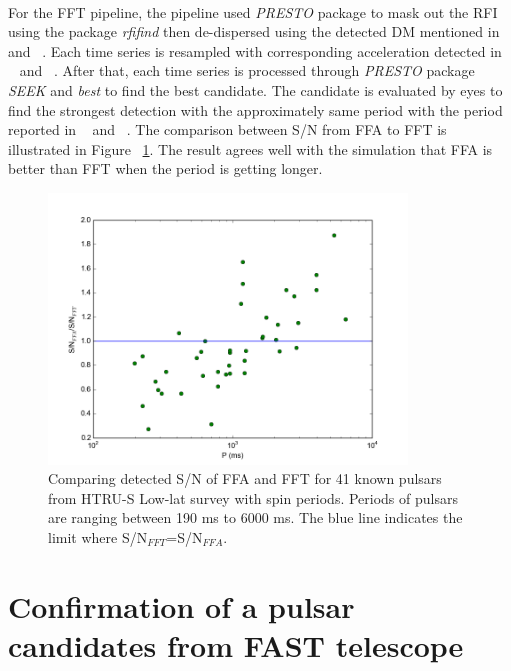 \documentclass[thesis_msc.tex]{subfiles}
\begin{document}
    \paragraph{} For the FFT pipeline, the pipeline used \textit{PRESTO} package to mask out the RFI using the package \textit{rfifind} then de-dispersed using the detected DM mentioned in ~\cite{Andrew} and ~\cite{Ng}. Each time series is resampled with corresponding acceleration detected in ~\cite{Andrew} and ~\cite{Ng}. After that, each time series is processed through \textit{PRESTO} package \textit{SEEK} and \textit{best} to find the best candidate. The candidate is evaluated by eyes to find the strongest detection with the approximately same period with the period reported in ~\cite{Andrew} and ~\cite{Ng}.  The comparison between S/N from FFA to FFT is illustrated in Figure ~\ref{FFA_FFT_real}. The result agrees well with the simulation that FFA is better than FFT when the period is getting longer.  
    
  \begin{figure}[h!]
\centering
\includegraphics[width=0.85\textwidth]{figures/FFA_FFT_real.png}
\caption{Comparing detected S/N of FFA and FFT for 41 known pulsars from HTRU-S Low-lat survey with spin periods. Periods of pulsars are ranging between 190 ms to 6000 ms. The blue line indicates the limit where S/N$_{FFT}$=S/N$_{FFA}.$}\label{FFA_FFT_real}
\end{figure}
\newpage 

    \section{Confirmation of a pulsar candidates from FAST telescope}
\end{document}

